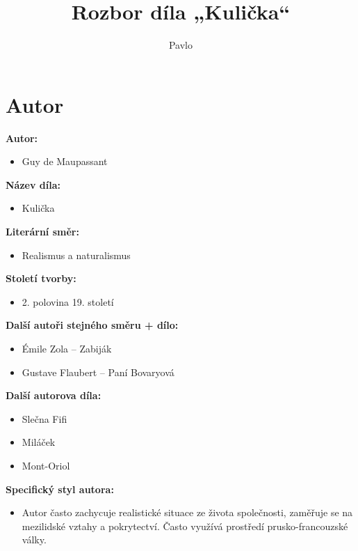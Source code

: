 \documentclass[12pt,a4paper]{article}
\title{\textbf{Rozbor díla „Kulička“}}
\author{Pavlo}
\date{}
\begin{document}
\maketitle

\section*{Autor}

\begin{tcolorbox}[breakable]

\textbf{Autor:}
\begin{itemize}
\item Guy de Maupassant
\end{itemize}

\textbf{Název díla:}
\begin{itemize}
\item Kulička
\end{itemize}

\textbf{Literární směr:}
\begin{itemize}
\item Realismus a naturalismus
\end{itemize}

\textbf{Století tvorby:}
\begin{itemize}
\item 2. polovina 19. století
\end{itemize}

\textbf{Další autoři stejného směru + dílo:}
\begin{itemize}
\item Émile Zola – Zabiják
\item Gustave Flaubert – Paní Bovaryová
\end{itemize}

\textbf{Další autorova díla:}
\begin{itemize}
\item Slečna Fifi
\item Miláček
\item Mont-Oriol
\end{itemize}

\textbf{Specifický styl autora:}
\begin{itemize}
\item Autor často zachycuje realistické situace ze života společnosti, zaměřuje se na mezilidské vztahy a pokrytectví. Často využívá prostředí prusko-francouzské války.
\end{itemize}

\end{tcolorbox}
\end{document}
